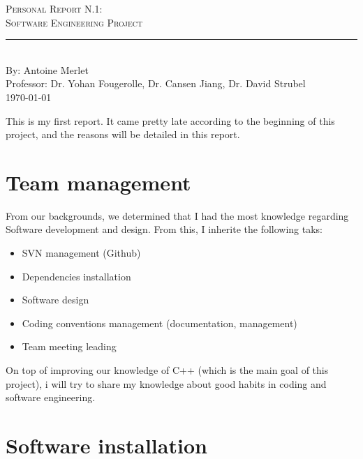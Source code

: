 \documentclass[aps,letterpaper,11pt]{revtex4}
\newcommand{\labno}{Personal Report N.1}
\newcommand{\labtitle}{Software Engineering Project}
\newcommand{\authorname}{Antoine Merlet}
\newcommand{\professor}{Dr. Yohan Fougerolle, Dr. Cansen Jiang, Dr. David Strubel}
\begin{document}
  
\begin{titlepage}
\begin{center}
{\LARGE \textsc{\labno:} \\ \vspace{4pt}}
{\Large \textsc{\labtitle} \\ \vspace{4pt}} 
\rule[13pt]{\textwidth}{1pt} \\ \vspace{150pt}
{\large By: \authorname \\ \vspace{10pt}
Professor: \professor \\ \vspace{10pt}
\today}
\end{center}




\end{titlepage}%
\newpage

This is my first report. It came pretty late according to the beginning of this project, and the reasons will be detailed in this report.


\section{Team management}
From our backgrounds, we determined that I had the most knowledge regarding Software development and design. From this, I inherite the following taks:

\begin{itemize}
\item SVN management (Github)
\item Dependencies installation
\item Software design
\item Coding conventions management (documentation, management)
\item Team meeting leading
\end{itemize}

On top of improving our knowledge of C++ (which is the main goal of this project), i will try to share my knowledge about good habits in coding and software engineering.

\section{Software installation}
\end{document}
